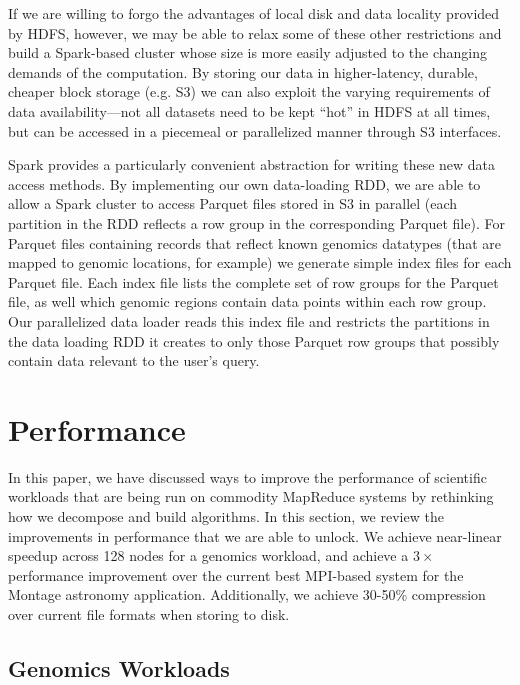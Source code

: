\documentclass{acm_proc_article-sp}
\begin{document}
If we are willing to forgo the advantages of local disk and data locality provided by HDFS, however, we
may be able to relax some of these other restrictions and build a Spark-based cluster whose size is more
easily adjusted to the changing demands of the computation. By storing our data in higher-latency,
durable, cheaper block storage (e.g. S3) we can also exploit the varying requirements of data \linebreak
availability---not all datasets need to be kept ``hot'' in HDFS at all times, but can be accessed in a
piecemeal or parallelized manner through S3 interfaces.

Spark provides a particularly convenient abstraction for writing these new data access methods.  By
implementing our own data-loading RDD, we are able to allow a Spark cluster to access Parquet files
stored in S3 in parallel (each partition in the RDD reflects a row group in the corresponding Parquet file).
For Parquet files containing records that reflect known genomics datatypes (that are mapped to genomic
locations, for example) we generate simple index files for each Parquet file.  Each index file lists the
complete set of row groups for the Parquet file, as well which genomic regions contain data points within
each row group.  Our parallelized data loader reads this index file and restricts the partitions in the data
loading RDD it creates to only those Parquet row groups that possibly contain data relevant to the
user's query.

\section{Performance}
\label{sec:performance}

In this paper, we have discussed ways to improve the performance of scientific workloads that are
being run on commodity MapReduce systems by rethinking how we decompose and build algorithms.
In this section, we review the improvements in performance that we are able to unlock. We achieve
near-linear speedup across 128 nodes for a genomics workload, and achieve a $3\times$ performance
improvement over the current best MPI-based system for the Montage astronomy application.
Additionally, we achieve 30-50\% compression over current file formats when storing to disk.

\subsection{Genomics Workloads}
\label{sec:genomics-performance}
\end{document}
